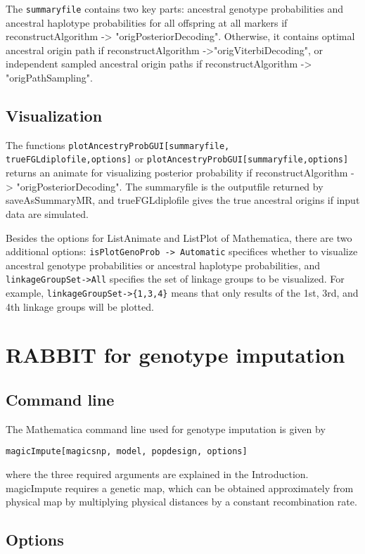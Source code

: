 \documentclass[12pt]{article}
\begin{document}
The \verb|summaryfile|  contains two key parts: ancestral genotype probabilities and ancestral haplotype probabilities for all offspring at all markers if reconstructAlgorithm -> "origPosteriorDecoding". Otherwise, it contains optimal ancestral origin path if  reconstructAlgorithm ->"origViterbiDecoding", or independent sampled ancestral origin paths if reconstructAlgorithm -> "origPathSampling". 

\subsection{Visualization}

The functions \verb|plotAncestryProbGUI[summaryfile, trueFGLdiplofile,options]| or \verb|plotAncestryProbGUI[summaryfile,options]| returns an animate for visualizing posterior probability if reconstructAlgorithm -> "origPosteriorDecoding". The summaryfile is the outputfile returned by saveAsSummaryMR, and trueFGLdiplofile gives the true ancestral origins if input data are simulated. 

Besides the options for ListAnimate and ListPlot of Mathematica, there are two additional options: \verb|isPlotGenoProb -> Automatic| specifices whether to visualize ancestral genotype probabilities or ancestral haplotype probabilities, and \verb|linkageGroupSet->All| specifies the set of linkage groups to be visualized. For example, \verb|linkageGroupSet->{1,3,4}| means that only results of the 1st, 3rd, and 4th linkage groups will be plotted. 

\section{RABBIT for genotype imputation}

\subsection{Command line}

The Mathematica command line used for genotype imputation is given by
\begin{verbatim}
magicImpute[magicsnp, model, popdesign, options]
\end{verbatim}
where the three required arguments are explained in the Introduction. magicImpute requires a genetic map, which can be obtained approximately from physical map by multiplying physical distances by a constant recombination rate.  

\subsection{Options}
\end{document}
